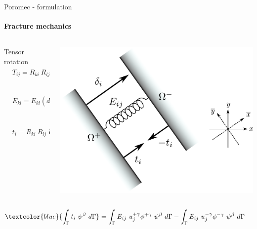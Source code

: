 \begin{frame}{Poromec - formulation}
\framesubtitle{Fracture mechanics}
\begin{columns}[T] %
\begin{column}{.48\textwidth}
Tensor rotation
\begin{align*}
    &T_{ij} = R_{ki}\ R_{lj}\ \overline{T}_{kl}\\\\
    &\overline{E}_{kl} = \overline{E}_{kl}(d, \overline{\delta}_l) = 
        \begin{bmatrix} 
            \overline{E_n}  & -                & -                 \\
                       -    & \overline{E_s}   &  -                \\
                       -    &       -          & \overline{E_t}   \\
        \end{bmatrix}\\   \\
    &t_i = R_{ki}\ R_{lj}\ \overline{E}_{kl}\ (u_j^+ - u_j^-)   \\
\end{align*}
\end{column}%
\hfill%
\begin{column}{.48\textwidth}
\includegraphics[width=\textwidth]{pdf/fracture}
\end{column}%
\end{columns}
\begin{align*}
    \textcolor{blue}{\int_\Gamma t_i\ \psi^\beta\ d\Gamma}
&=  \int_\Gamma E_{ij}\ u_j^{+\gamma}\phi^{+\gamma}\ \psi^\beta\ d\Gamma
-   \int_\Gamma E_{ij}\ u_j^{-\gamma}\phi^{-\gamma}\ \psi^\beta\ d\Gamma
\end{align*}
\end{frame}

